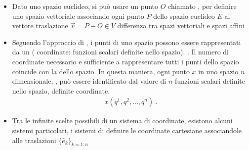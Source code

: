 \documentclass[letterpaper,10pt,english]{jupyterBook}
\begin{document}
\begin{itemize}
\begin{enumerate}
\end{enumerate}

\item {} 
\sphinxAtStartPar
{} Dato uno spazio euclideo, si può usare un punto \(O\)  chiamato , per definire uno spazio vettoriale associando ogni punto \(P\) dello spazio euclideo \(E\) al vettore traslazione \(\vec{v} = P - O \in V\)  differenza tra spazi vettoriali e spazi affini

\item {} 
\sphinxAtStartPar
Seguendo l’approccio di , i punti di uno spazio possono essere rappresentati da un  ( coordinate: funzioni scalari definite nello spazio). . Il numero di coordinate necessario e sufficiente a rappresentare tutti i punti dello spazio coincide con la  dello spazio. In questa maniera, ogni punto \(x\) in uno spazio \(n\)\sphinxhyphen{}dimensionale, , può essere identificato dal valore di \(n\) funzioni scalari definite nello spazio, definite coordinate.
\begin{equation*}
\begin{split}x(q^1, q^2, \dots, q^n) \ .\end{split}
\end{equation*}
\item {} 
\sphinxAtStartPar
Tra le infinite scelte possibili di un sistema di coordinate, esistono alcuni sistemi particolari, i sistemi di   definire le coordinate cartesiane associandole alle traslazioni \(\{ \hat{e}_k \}_{k=1:n}\)


\end{itemize}
\end{document}
